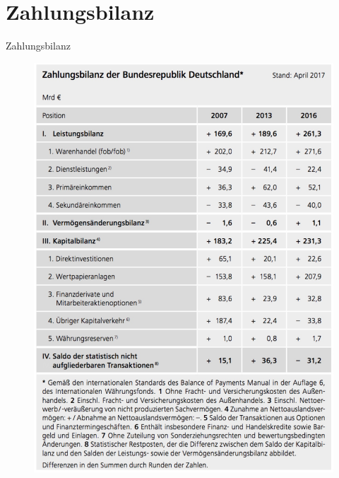 \documentclass[10pt,a4paper, ngerman]{beamer}
\begin{document}
\section{Zahlungsbilanz}
\begin{frame}{Zahlungsbilanz}
\begin{figure}
\centering
\includegraphics[height=0.9\textheight]{zahlungsbilanz_de}
\end{figure}
\end{frame}

\begin{frame}
\titlepage
\end{frame}
\end{document}
